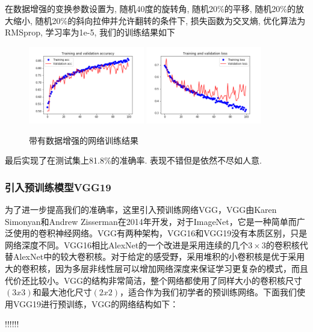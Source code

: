 \documentclass[lang=cn,11pt]{elegantpaper}
\begin{document}
在数据增强的变换参数设置为, 随机40度的旋转角, 随机20\%的平移, 随机20\%的放大缩小, 随机20\%的斜向拉伸并允许翻转的条件下, 损失函数为交叉熵, 优化算法为RMSprop, 学习率为1e-5, 我们的训练结果如下

\begin{figure}[hbt]
\centering
  \includegraphics[width=0.45\textwidth]{small_aug_1.png}
  \includegraphics[width=0.45\textwidth]{small_aug_2.png}
  \caption{带有数据增强的网络训练结果}
\end{figure}

最后实现了在测试集上81.8\%的准确率. 表现不错但是依然不尽如人意.


\subsubsection{引入预训练模型VGG19}

为了进一步提高我们的准确率，这里引入预训练网络VGG，VGG由Karen Simonyan和Andrew Zisserman在2014年开发，对于ImageNet，它是一种简单而广泛使用的卷积神经网络。VGG有两种架构，VGG16和VGG19没有本质区别，只是网络深度不同。VGG16相比AlexNet的一个改进是采用连续的几个$3\times 3$的卷积核代替AlexNet中的较大卷积核。对于给定的感受野，采用堆积的小卷积核是优于采用大的卷积核，因为多层非线性层可以增加网络深度来保证学习更复杂的模式，而且代价还比较小。VGG的结构非常简洁，整个网络都使用了同样大小的卷积核尺寸$(3x3)$和最大池化尺寸$(2x2)$，适合作为我们初学者的预训练网络。下面我们使用VGG19进行预训练，VGG的网络结构如下：

!!!!!!

%
%
\end{document}
